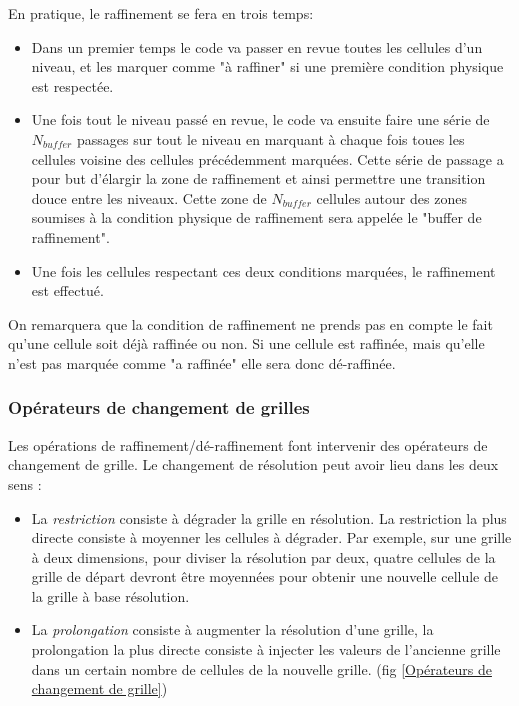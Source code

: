 En pratique, le raffinement se fera en trois temps:

\begin{itemize}
\item Dans un premier temps le code va passer en revue toutes les cellules d'un niveau, et les marquer comme "à raffiner" si une première condition physique est respectée.

\item Une fois tout le niveau passé en revue, le code va ensuite faire une série de $N_{buffer}$ passages sur tout le niveau en marquant à chaque fois toues les cellules voisine des cellules précédemment marquées.
Cette série de passage a pour but d’élargir la zone de raffinement et ainsi permettre une transition douce entre les niveaux.
Cette zone de $N_{buffer}$ cellules autour des zones soumises à la condition physique de raffinement sera appelée le "buffer de raffinement".

\item Une fois les cellules respectant ces deux conditions marquées, le raffinement est effectué.
\end{itemize}


On remarquera que la condition de raffinement ne prends pas en compte le fait qu'une cellule soit déjà raffinée ou non.
Si une cellule est raffinée, mais qu'elle n'est pas marquée comme "a raffinée" elle sera donc dé-raffinée.

\subsubsection{Opérateurs de changement de grilles} \label{Opérateurs de changement de grilles}

Les opérations de raffinement/dé-raffinement font intervenir des opérateurs de changement de grille.
Le changement de résolution peut avoir lieu dans les deux sens :

\begin{itemize}
\item La \emph{restriction} consiste à dégrader la grille en résolution. 
La restriction la plus directe consiste à moyenner les cellules à dégrader. 
Par exemple, sur une grille à deux dimensions, pour diviser la résolution par deux, quatre cellules de la grille de départ devront être moyennées pour obtenir une nouvelle cellule de la grille à base résolution.

\item La \emph{prolongation} consiste à augmenter la résolution d'une grille, la prolongation la plus directe consiste à injecter les valeurs de l'ancienne grille dans un certain nombre de cellules de la nouvelle grille. (fig \ref{Opérateurs de changement de grille})
\end{itemize}

